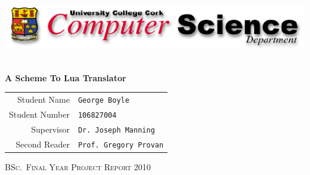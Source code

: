 \begin{titlepage}
\begin{center}

\includegraphics[width=\textwidth]{cslogo.png}

\hfill \\[35mm]

\textbf{\LARGE A Scheme To Lua Translator} \\[35mm]

\large

\begin{tabular}{r||l}
Student Name & \texttt{George Boyle} \\
Student Number & \texttt{106827004} \\[10mm]
Supervisor & \texttt{Dr.\ Joseph Manning} \\
Second Reader & \texttt{Prof.\ Gregory Provan} \\
\end{tabular}

\vfill

\textsc{BSc.\ Final Year Project Report 2010}

\end{center}
\end{titlepage}
